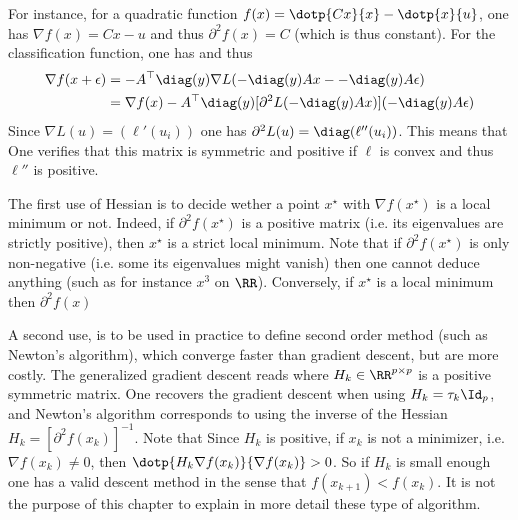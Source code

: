 For instance, for a quadratic function $f(x)=\dotp{C x}{x} - \dotp{x}{u}$, one has $\nabla f(x) = Cx-u$ and thus $\partial^2 f(x) = C$ (which is thus constant).
%
For the classification function, one has 
and thus
\begin{align*}
	\nabla f(x+\epsilon) &= -A^\top \diag(y) \nabla L( -\diag(y) Ax - -\diag(y) A\epsilon)  \\
		&= \nabla f(x)  -A^\top \diag(y) [\partial^2 L( -\diag(y) Ax)]( -\diag(y) A\epsilon) 
\end{align*}
Since $\nabla L(u) = (\ell'(u_i))$ one has $\partial^2 L(u)=\diag(\ell''(u_i))$. This means that 
One verifies that this matrix is symmetric and positive if $\ell$ is convex and thus $\ell''$ is positive. 

\begin{rem}
The first use of Hessian is to decide wether a point $x^\star$ with $\nabla f(x^\star)$ is a local minimum or not. Indeed, if $\partial^2 f(x^\star)$ is a positive matrix (i.e. its eigenvalues are strictly positive), then $x^\star$ is a strict local minimum. 
%
Note that if $\partial^2 f(x^\star)$ is only non-negative (i.e. some its eigenvalues might vanish) then one cannot deduce anything (such as for instance $x^3$ on $\RR$). 
%
Conversely, if $x^\star$ is a local minimum then $\partial^2 f(x)$
\end{rem}

\begin{rem}
A second use, is to be used in practice to define second order method (such as Newton's algorithm), which converge faster than gradient descent, but are more costly. The generalized gradient descent reads
where $H_k \in \RR^{p \times p}$ is a positive symmetric matrix. One recovers the gradient descent when using $H_k=\tau_k \Id_p$, and Newton's algorithm corresponds to using the inverse of the Hessian $H_k=[\partial^2 f(x_k)]^{-1}$.
%
Note that
Since $H_k$ is positive, if $x_k$ is not a minimizer, i.e. $\nabla f(x_k) \neq 0$, then $\dotp{H_k \nabla f(x_k)}{\nabla f(x_k)}>0$.
%
So if $H_k$ is small enough one has a valid descent method in the sense that $f(x_{k+1}) < f(x_k)$.
%
It is not the purpose of this chapter to explain in more detail these type of algorithm.
\end{rem}

